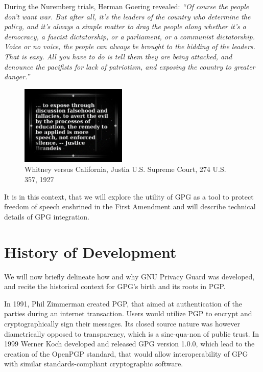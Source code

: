 \documentclass[twoside,twocolumn]{article}
\begin{document}
During the Nuremberg trials, Herman Goering revealed:
\textit{``Of course the people don't want war. But after all, it's the leaders of the country who determine the policy, and it's always a simple matter to drag the people along whether it's a democracy, a fascist dictatorship, or a parliament, or a communist dictatorship. Voice or no voice, the people can always be brought to the bidding of the leaders. That is easy. All you have to do is tell them they are being attacked, and denounce the pacifists for lack of patriotism, and exposing the country to greater danger.''}\cite{goering}



\begin{figure}
\centering
  \includegraphics[width=0.45\textwidth]{i/brandeis.jpg}
  \caption{Whitney versus California, Justia U.S. Supreme Court, 274 U.S. 357, 1927
  }
\end{figure}

It is in this context,
that we will explore the utility of GPG as a tool to protect
freedom of speech enshrined in the First Amendment
and will describe technical details of GPG integration.


\section*{History of Development}
We will now briefly delineate how and why
GNU Privacy Guard was developed, and recite the 
historical context for GPG's birth and its roots in PGP.

In 1991, Phil Zimmerman created PGP, that aimed at authentication of the parties during an internet transaction.
Users would utilize
PGP to encrypt and cryptographically sign 
their messages.
Its closed source nature was however diametrically opposed to transparency,
which is a sine-qua-non of public trust.
In 1999 Werner Koch\cite{wernerkoch} developed and released GPG version 1.0.0,
which lead to the creation of the OpenPGP standard\cite{openpgp},
that would allow interoperability of GPG with similar standards-compliant cryptographic software.
\end{document}
